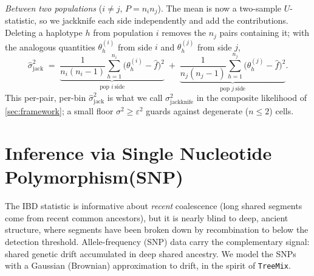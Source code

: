 \documentclass[12pt]{article}
\theoremstyle{definition}
\theoremstyle{definition}
\theoremstyle{lemma}
\theoremstyle{remark}
\theoremstyle{definition}
\begin{document}
\emph{Between two populations} ($i\neq j$, $P=n_in_j$). The mean is now a
two-sample $U$-statistic, so we jackknife each side independently and add the
contributions. Deleting a haplotype $h$ from population $i$ removes the $n_j$
pairs containing it; with the analogous quantities $\theta^{(i)}_h$ from side
$i$ and $\theta^{(j)}_h$ from side $j$,
\[
  \hat\sigma^2_{\text{jack}}
  \;=\;
  \underbrace{\frac{1}{n_i(n_i-1)}\sum_{h=1}^{n_i}\big(\theta^{(i)}_h-\hat f\big)^2}_{\text{pop } i\ \text{side}}
  \;+\;
  \underbrace{\frac{1}{n_j(n_j-1)}\sum_{h=1}^{n_j}\big(\theta^{(j)}_h-\hat f\big)^2}_{\text{pop } j\ \text{side}} .
\]
This per-pair, per-bin $\hat\sigma^2_{\text{jack}}$ is what we call
$\sigma^2_{\text{jackknife}}$ in the composite likelihood of
\cref{sec:framework}; a small floor $\sigma^2\ge\varepsilon^2$ guards against
degenerate ($n\le2$) cells.
\section{Inference via Single Nucleotide Polymorphism(SNP)}\label{sec:snp}
The IBD statistic is informative about \emph{recent} coalescence (long shared
segments come from recent common ancestors), but it is nearly blind to deep,
ancient structure, where segments have been broken down by recombination to
below the detection threshold. Allele-frequency (SNP) data carry the
complementary signal: shared genetic drift accumulated in deep shared ancestry.
We model the SNPs with a Gaussian (Brownian) approximation to drift, in the
spirit of \texttt{TreeMix}.
\end{document}
